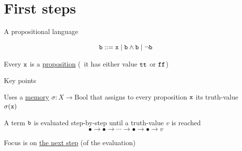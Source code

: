 \documentclass{beamer}
\begin{document}
\section{First steps}

\begin{frame}{A propositional language}

        \begin{block}{\vspace*{-3.5ex}}
        \[
                \mathtt{b} ::= \mathtt{x} \mid \mathtt{b} \wedge \mathtt{b} \mid \neg \mathtt{b}
        \]
        \end{block} 

        \bigskip
        \centering
        Every $\mathtt{x}$ is a \alert{\underline{proposition}} (\ie\ it has
        either value $\mathtt{tt}$ or $\mathtt{ff}$)

        \pause
        \vfill
        \centering
\end{frame}

\begin{frame}{Key points}

        Uses a \alert{\underline{memory}} $\sigma : X \to
        \mathrm{Bool}$
        that assigns to every proposition $\mathtt{x}$ its truth-value
        $\sigma(\mathtt{x})$

        \bigskip
        A term $\mathtt{b}$ is evaluated step-by-step 
        until a truth-value $v$ is reached
        \[
                \bullet \longrightarrow \bullet \longrightarrow \cdots 
                \longrightarrow 
                \bullet \longrightarrow \bullet \longrightarrow v
        \]
        

        Focus is on \alert{\underline{the next step}} (of the evaluation)
\end{frame}
\end{document}
